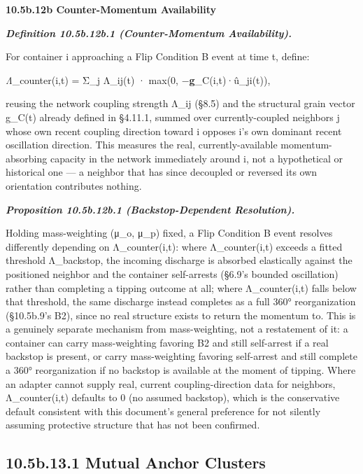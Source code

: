 \documentclass[
]{article}
\begin{document}
\textbf{10.5b.12b Counter-Momentum Availability}

\emph{\textbf{Definition 10.5b.12b.1 (Counter-Momentum Availability).}}

For container i approaching a Flip Condition B event at time t, define:

\emph{Λ}\_counter(i,t) = Σ\_j Λ\_ij(t) · max(0,
−\textbf{g}\_C(i,t)·û\_ji(t)),

reusing the network coupling strength Λ\_ij (§8.5) and the structural
grain vector g\_C(t) already defined in §4.11.1, summed over
currently-coupled neighbors j whose own recent coupling direction toward
i opposes i's own dominant recent oscillation direction. This measures
the real, currently-available momentum-absorbing capacity in the network
immediately around i, not a hypothetical or historical one --- a
neighbor that has since decoupled or reversed its own orientation
contributes nothing.

\emph{\textbf{Proposition 10.5b.12b.1 (Backstop-Dependent Resolution).}}

Holding mass-weighting (μ\_o, μ\_p) fixed, a Flip Condition B event
resolves differently depending on Λ\_counter(i,t): where Λ\_counter(i,t)
exceeds a fitted threshold Λ\_backstop, the incoming discharge is
absorbed elastically against the positioned neighbor and the container
self-arrests (§6.9's bounded oscillation) rather than completing a
tipping outcome at all; where Λ\_counter(i,t) falls below that
threshold, the same discharge instead completes as a full 360°
reorganization (§10.5b.9's B2), since no real structure exists to return
the momentum to. This is a genuinely separate mechanism from
mass-weighting, not a restatement of it: a container can carry
mass-weighting favoring B2 and still self-arrest if a real backstop is
present, or carry mass-weighting favoring self-arrest and still complete
a 360° reorganization if no backstop is available at the moment of
tipping. Where an adapter cannot supply real, current coupling-direction
data for neighbors, Λ\_counter(i,t) defaults to 0 (no assumed backstop),
which is the conservative default consistent with this document's
general preference for not silently assuming protective structure that
has not been confirmed.

\hypertarget{b.13.1-mutual-anchor-clusters}{%
\subsection{10.5b.13.1 Mutual Anchor
Clusters}\label{b.13.1-mutual-anchor-clusters}}
\end{document}
